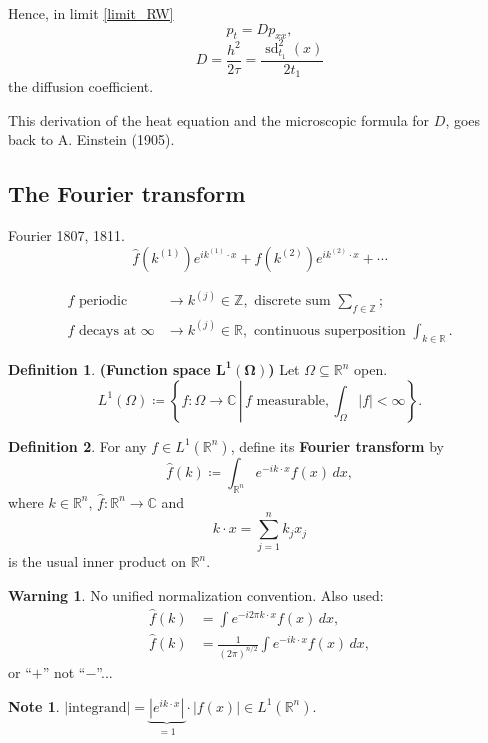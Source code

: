 \documentclass[12pt]{article}
\DeclareMathOperator{\sd}{sd}
\theoremstyle{definition}
\newtheorem*{definition*}{Definition}
\newtheorem*{note}{Note}
\newtheorem*{warning}{Warning}
\begin{document}
Hence, in limit \eqref{limit_RW}
\[p_t=Dp_{xx},\]
\[D=\frac{h^2}{2\tau}=\frac{\sd^2_{t_1}(x)}{2t_1}\]
the diffusion coefficient.

This derivation of the heat equation and the microscopic formula for $D$, goes back to A. Einstein (1905).

\subsection{The Fourier transform}
Fourier 1807, 1811.
\[\hat{f}(k^{(1)})e^{ik^{(1)}\cdot x}+\hat{f}(k^{(2)})e^{ik^{(2)}\cdot x}+\cdots\]

\begin{align*}
f\text{ periodic}&\longrightarrow k^{(j)}\in\mathbb{Z},\text{ discrete sum }\sum_{f\in\mathbb{Z}};\\
f\text{ decays at }\infty&\longrightarrow k^{(j)}\in\mathbb{R},\text{ continuous superposition }\int_{k\in\mathbb{R}}.
\end{align*}

\begin{definition*}
\textbf{(Function space $\boldsymbol{L^1(\Omega)}$)} Let $\Omega\subseteq\mathbb{R}^n$ open.
\[L^1(\Omega)\coloneqq\left\{f:\Omega\longrightarrow\mathbb{C}\,\left|\,f\text{ measurable},\int_{\Omega}|f|<\infty\right.\right\}.\]
\end{definition*}

\begin{definition*}
For any $f\in L^1(\mathbb{R}^n)$, define its \textbf{Fourier transform} by
\[\hat{f}(k)\coloneqq\int_{\mathbb{R}^n}e^{-ik\cdot x}f(x)\,dx,\]
where $k\in\mathbb{R}^n$, $\hat{f}:\mathbb{R}^n\rightarrow\mathbb{C}$ and
\[k\cdot x=\sum_{j=1}^nk_jx_j\]
is the usual inner product on $\mathbb{R}^n$.
\end{definition*}

\begin{warning}
No unified normalization convention. Also used:
\begin{align*}
\hat{f}(k)&=\int e^{-i2\pi k\cdot x}f(x)\,dx,\\
\hat{f}(k)&=\frac{1}{(2\pi)^{n/2}}\int e^{-ik\cdot x}f(x)\,dx,
\end{align*}
or ``$+$'' not ``$-$''...
\end{warning}

\begin{note}
$|\text{integrand}|=\underbrace{|e^{ik\cdot x}|}_{=1}\cdot|f(x)|\in L^1(\mathbb{R}^n)$.
\end{note}
\end{document}
